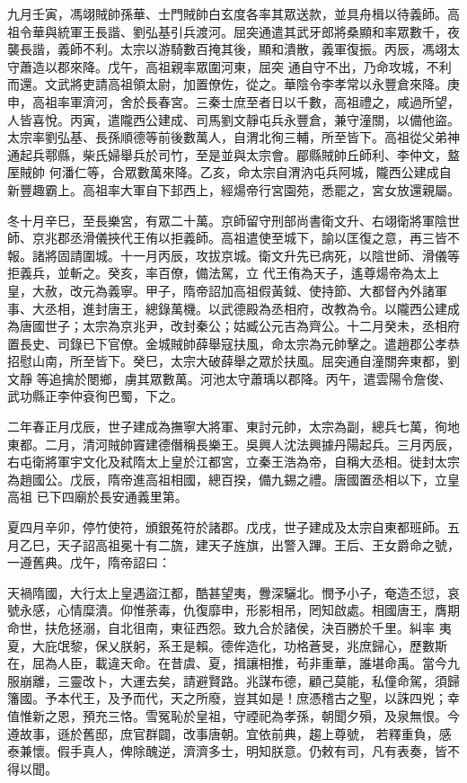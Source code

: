 \begin{pinyinscope}
 九月壬寅，馮翊賊帥孫華、士門賊帥白玄度各率其眾送款，並具舟楫以待義師。高祖令華與統軍王長諧、劉弘基引兵渡河。屈突通遣其武牙郎將桑顯和率眾數千，夜襲長諧，義師不利。太宗以游騎數百掩其後，顯和潰散，義軍復振。丙辰，馮翊太守蕭造以郡來降。戊午，高祖親率眾圍河東，屈突
 通自守不出，乃命攻城，不利而還。文武將吏請高祖領太尉，加置僚佐，從之。華陰令李孝常以永豐倉來降。庚申，高祖率軍濟河，舍於長春宮。三秦士庶至者日以千數，高祖禮之，咸過所望，人皆喜悅。丙寅，遣隴西公建成、司馬劉文靜屯兵永豐倉，兼守潼關，以備他盜。太宗率劉弘基、長孫順德等前後數萬人，自渭北徇三輔，所至皆下。高祖從父弟神通起兵鄠縣，柴氏婦舉兵於司竹，至是並與太宗會。郿縣賊帥丘師利、李仲文，盩厔賊帥
 何潘仁等，合眾數萬來降。乙亥，命太宗自渭汭屯兵阿城，隴西公建成自新豐趣霸上。高祖率大軍自下邽西上，經煬帝行宮園苑，悉罷之，宮女放還親屬。



 冬十月辛巳，至長樂宮，有眾二十萬。京師留守刑部尚書衛文升、右翊衛將軍陰世師、京兆郡丞滑儀挾代王侑以拒義師。高祖遣使至城下，諭以匡復之意，再三皆不報。諸將固請圍城。十一月丙辰，攻拔京城。衛文升先已病死，以陰世師、滑儀等拒義兵，並斬之。癸亥，率百僚，備法駕，立
 代王侑為天子，遙尊煬帝為太上皇，大赦，改元為義寧。甲子，隋帝詔加高祖假黃鉞、使持節、大都督內外諸軍事、大丞相，進封唐王，總錄萬機。以武德殿為丞相府，改教為令。以隴西公建成為唐國世子；太宗為京兆尹，改封秦公；姑臧公元吉為齊公。十二月癸未，丞相府置長史、司錄已下官僚。金城賊帥薛舉寇扶風，命太宗為元帥擊之。遣趙郡公孝恭招慰山南，所至皆下。癸巳，太宗大破薛舉之眾於扶風。屈突通自潼關奔東都，劉文靜
 等追擒於閿鄉，虜其眾數萬。河池太守蕭瑀以郡降。丙午，遣雲陽令詹俊、武功縣正李仲袞徇巴蜀，下之。



 二年春正月戊辰，世子建成為撫寧大將軍、東討元帥，太宗為副，總兵七萬，徇地東都。二月，清河賊帥竇建德僭稱長樂王。吳興人沈法興據丹陽起兵。三月丙辰，右屯衛將軍宇文化及弒隋太上皇於江都宮，立秦王浩為帝，自稱大丞相。徙封太宗為趙國公。戊辰，隋帝進高祖相國，總百揆，備九錫之禮。唐國置丞相以下，立皇高祖
 已下四廟於長安通義里第。



 夏四月辛卯，停竹使符，頒銀菟符於諸郡。戊戌，世子建成及太宗自東都班師。五月乙巳，天子詔高祖冕十有二旒，建天子旌旗，出警入蹕。王后、王女爵命之號，一遵舊典。戊午，隋帝詔曰：



 天禍隋國，大行太上皇遇盜江都，酷甚望夷，釁深驪北。憫予小子，奄造丕愆，哀號永感，心情糜潰。仰惟荼毒，仇復靡申，形影相吊，罔知啟處。相國唐王，膺期命世，扶危拯溺，自北徂南，東征西怨。致九合於諸侯，決百勝於千里。糾率
 夷夏，大庇氓黎，保乂朕躬，系王是賴。德侔造化，功格蒼旻，兆庶歸心，歷數斯在，屈為人臣，載違天命。在昔虞、夏，揖讓相推，茍非重華，誰堪命禹。當今九服崩離，三靈改卜，大運去矣，請避賢路。兆謀布德，顧己莫能，私僮命駕，須歸籓國。予本代王，及予而代，天之所廢，豈其如是！庶憑稽古之聖，以誅四兇；幸值惟新之恩，預充三恪。雪冤恥於皇祖，守禋祀為孝孫，朝聞夕殞，及泉無恨。今遵故事，遜於舊邸，庶官群闢，改事唐朝。宜依前典，趨上尊號，
 若釋重負，感泰兼懷。假手真人，俾除醜逆，濟濟多士，明知朕意。仍敕有司，凡有表奏，皆不得以聞。




\end{pinyinscope}

